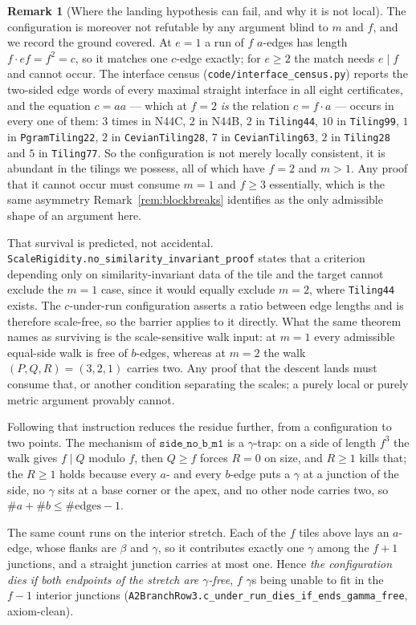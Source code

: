 \documentclass[11pt,reqno]{amsart}
\theoremstyle{plain}
\theoremstyle{definition}
\newtheorem{remark}[theorem]{Remark}
\begin{document}
\begin{remark}[Where the landing hypothesis can fail, and why it is not local]
The configuration is moreover not refutable by any argument blind to $m$ and $f$, and we record the
ground covered. At $e=1$ a run of $f$ $a$-edges has length $f\cdot ef=f^2=c$, so it matches one
$c$-edge exactly; for $e\ge2$ the match needs $e\mid f$ and cannot occur. The interface census
(\texttt{code/interface\_census.py}) reports the two-sided edge words of every maximal straight
interface in all eight certificates, and the equation $c=aa$ --- which at $f=2$ \emph{is} the
relation $c=f\cdot a$ --- occurs in every one of them: $3$ times in N44C, $2$ in N44B, $2$ in
\texttt{Tiling44}, $10$ in \texttt{Tiling99}, $1$ in \texttt{PgramTiling22}, $2$ in
\texttt{CevianTiling28}, $7$ in \texttt{CevianTiling63}, $2$ in \texttt{Tiling28} and $5$ in
\texttt{Tiling77}. So the configuration is not merely locally consistent, it is abundant in the
tilings we possess, all of which have $f=2$ and $m>1$. Any proof that it cannot occur must consume
$m=1$ and $f\ge3$ essentially, which is the same asymmetry Remark~\ref{rem:blockbreaks} identifies
as the only admissible shape of an argument here.

That survival is predicted, not accidental. \texttt{ScaleRigidity.no\_similarity\_invariant\_proof}
states that a criterion depending only on similarity-invariant data of the tile and the target cannot
exclude the $m=1$ case, since it would equally exclude $m=2$, where \texttt{Tiling44} exists. The
$c$-under-run configuration asserts a ratio between edge lengths and is therefore scale-free, so the
barrier applies to it directly. What the same theorem names as surviving is the scale-sensitive walk
input: at $m=1$ every admissible equal-side walk is free of $b$-edges, whereas at $m=2$ the walk
$(P,Q,R)=(3,2,1)$ carries two. Any proof that the descent lands must consume that, or another
condition separating the scales; a purely local or purely metric argument provably cannot.

Following that instruction reduces the residue further, from a configuration to two points. The
mechanism of $\texttt{side\_no\_b\_m1}$ is a $\gamma$-trap: on a side of length $f^3$ the walk
gives $f\mid Q$ modulo $f$, then $Q\ge f$ forces $R=0$ on size, and $R\ge1$ kills that; the $R\ge1$
holds because every $a$- and every $b$-edge puts a $\gamma$ at a junction of the side, no $\gamma$
sits at a base corner or the apex, and no other node carries two, so $\#a+\#b\le\#\text{edges}-1$.

The same count runs on the interior stretch. Each of the $f$ tiles above lays an $a$-edge, whose
flanks are $\beta$ and $\gamma$, so it contributes exactly one $\gamma$ among the $f+1$ junctions,
and a straight junction carries at most one. Hence \emph{the configuration dies if both endpoints of
the stretch are $\gamma$-free}, $f$ $\gamma$s being unable to fit in the $f-1$ interior junctions
(\texttt{A2BranchRow3.c\_under\_run\_dies\_if\_ends\_gamma\_free}, axiom-clean).


\end{remark}
\end{document}
